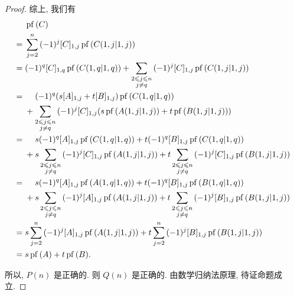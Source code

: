\begin{proof}
    综上, 我们有
    \begin{align*}
             &
        \operatorname{pf} {(C)}
        \\
        = {} &
        \sum_{j=2}^{n}
        {(-1)^j [C]_{1,j}
        \operatorname{pf} {(C({1,j}|{1,j}))}}
        \\
        = {} &
        (-1)^q [C]_{1,q}
        \operatorname{pf} {(C({1,q}|{1,q}))}
        +
        \sum_{\substack{2 \leq j \leq n     \\j \neq q}}
        {(-1)^j [C]_{1,j}
        \operatorname{pf} {(C({1,j}|{1,j}))}}
        \\
        = {} &
        \hphantom{{} + {}}
        (-1)^q (s[A]_{1,j} + t[B]_{1,j})
        \operatorname{pf} {(C({1,q}|{1,q}))}
        \\
             &
        +
        \sum_{\substack{2 \leq j \leq n     \\j \neq q}}
        {(-1)^j [C]_{1,j}
        (s \operatorname{pf} {(A({1,j}|{1,j}))}
        + t \operatorname{pf} {(B({1,j}|{1,j}))})
        }
        \\
        = {} &
        \hphantom{{} + {}}
        s (-1)^q [A]_{1,j}
        \operatorname{pf} {(C({1,q}|{1,q}))}
        + t (-1)^q [B]_{1,j}
        \operatorname{pf} {(C({1,q}|{1,q}))}
        \\
             &
        +
        s \sum_{\substack{2 \leq j \leq n   \\j \neq q}}
        {(-1)^j [C]_{1,j}
        \operatorname{pf} {(A({1,j}|{1,j}))}
        }
        + t \sum_{\substack{2 \leq j \leq n \\j \neq q}}
        {(-1)^j [C]_{1,j}
        \operatorname{pf} {(B({1,j}|{1,j}))}
        }
        \\
        = {} &
        \hphantom{{} + {}}
        s (-1)^q [A]_{1,j}
        \operatorname{pf} {(A({1,q}|{1,q}))}
        + t (-1)^q [B]_{1,j}
        \operatorname{pf} {(B({1,q}|{1,q}))}
        \\
             &
        +
        s \sum_{\substack{2 \leq j \leq n   \\j \neq q}}
        {(-1)^j [A]_{1,j}
        \operatorname{pf} {(A({1,j}|{1,j}))}
        }
        + t \sum_{\substack{2 \leq j \leq n \\j \neq q}}
        {(-1)^j [B]_{1,j}
        \operatorname{pf} {(B({1,j}|{1,j}))}
        }
        \\
        = {} &
        s \sum_{j=2}^{n}
        {(-1)^j [A]_{1,j}
        \operatorname{pf} {(A({1,j}|{1,j}))}
        }
        +
        t \sum_{j=2}^{n}
        {(-1)^j [B]_{1,j}
        \operatorname{pf} {(B({1,j}|{1,j}))}
        }
        \\
        = {} &
        s \operatorname{pf} {(A)}
        + t \operatorname{pf} {(B)}.
    \end{align*}

    所以, \(P(n)\) 是正确的.
    则 \(Q(n)\) 是正确的.
    由数学归纳法原理, 待证命题成立.
\end{proof}

